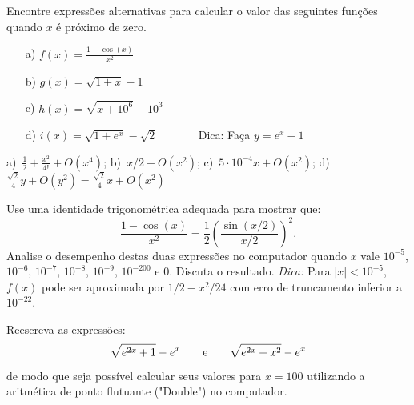 \begin{Exercise} Encontre expressões alternativas para calcular o valor das seguintes funções quando $x$ é próximo de zero.
\begin{itemize}
\item[a)] $f(x)=\frac{1-\cos(x)}{x^2}$
\item[b)] $g(x)=\sqrt{1+x}-1$
\item[c)] $h(x)=\sqrt{x+10^6}-10^3$
\item[d)] $i(x)=\sqrt{1+e^{x}}-\sqrt{2}$ ~~~~~~ Dica: Faça $y=e^{x}-1$
\end{itemize}
\end{Exercise}
\begin{Answer}
  \begin{tiny}
    a)~$\frac{1}{2}+\frac{x^2}{4!}+O(x^4)$; b)~$x/2+O(x^2)$; c)~$5\cdot 10^{-4}x+O(x^2)$; d)~$\frac{\sqrt{2}}{4}y+O(y^{2})=\frac{\sqrt{2}}{4}x+O(x^2)$
  \end{tiny}
\end{Answer}

\begin{Exercise} Use uma identidade trigonométrica adequada para mostrar que:
  \begin{equation*}
    \frac{1-\cos(x)}{x^2}= \frac{1}{2} \left(\frac{\sin(x/2)}{x/2}\right)^2.
  \end{equation*}
Analise o desempenho destas duas expressões no computador quando $x$ vale $10^{-5}$, $10^{-6}$, $10^{-7}$, $10^{-8}$, $10^{-9}$, $10^{-200}$ e $0$. Discuta o resultado.
\emph{Dica:} Para $|x|<10^{-5}$, $f(x)$ pode ser aproximada por $1/2-x^2/24$ com erro de truncamento inferior a $10^{-22}$.
\end{Exercise}



\begin{Exercise}[title=Notas do prof. Guidi] Reescreva as expressões:
  $$\sqrt{e^{2x}+1}-e^x \qquad\hbox{e}\qquad \sqrt{e^{2x}+x^2}-e^x $$
  de modo que seja possível calcular seus valores para $x=100$ utilizando a aritmética de ponto flutuante ("Double") no computador.
\end{Exercise}

